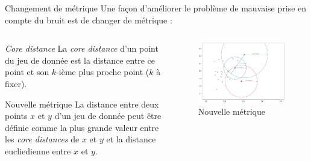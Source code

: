 \begin{frame}{Changement de métrique}
    Une façon d'améliorer le problème de mauvaise prise en compte du bruit est de changer de métrique :
    \begin{columns}
        \begin{column}{0.55\textwidth}
            \begin{block}{\emph{Core distance}}
                La \emph{core distance} d'un point du jeu de donnée est la distance entre ce point et son $k$-ième plus proche point ($k$ à fixer).
            \end{block}
        
            \begin{block}{Nouvelle métrique}
                La distance entre deux points $x$ et $y$ d'un jeu de donnée peut être définie comme la plus grande valeur entre les \emph{core distances} de $x$ et $y$ et la distance eucliedienne entre $x$ et $y$.
            \end{block}
        \end{column}
        \begin{column}{0.4\textwidth}
            \begin{figure}
                \includegraphics[width=0.6\paperheight]{images/metrique.png}
                \caption{\label{fig:metrique}Nouvelle métrique}
            \end{figure}
        \end{column}
    \end{columns}
\end{frame}



